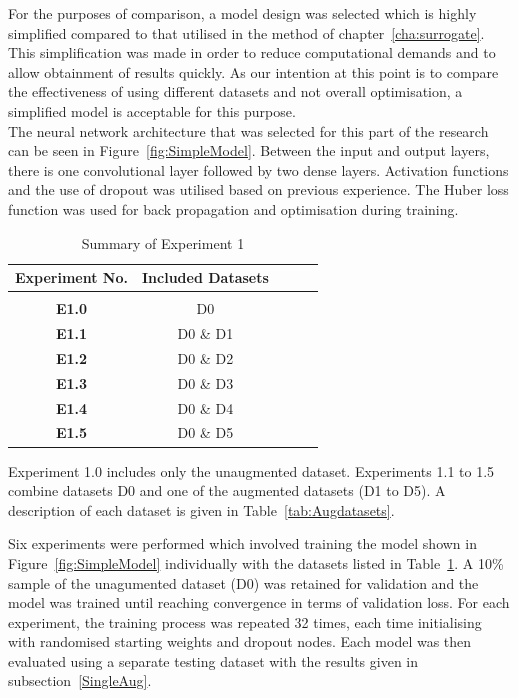 \noindent
For the purposes of comparison, a model design was selected which is highly simplified compared to that utilised in the method of chapter~\ref{cha:surrogate}. This simplification was made in order to reduce computational demands and to allow obtainment of results quickly. As our intention at this point is to compare the effectiveness of using different datasets and not overall optimisation, a simplified model is acceptable for this purpose. 
\\

\noindent
The neural network architecture that was selected for this part of the research can be seen in Figure~\ref{fig:SimpleModel}. Between the input and output layers, there is one convolutional layer followed by two dense layers. Activation functions and the use of dropout was utilised based on previous experience. The Huber loss function was used for back propagation and optimisation during training.
\\

\begin{table}[h!]
	 \begin{center}
		
		\begin{tabular}{c|c|c|r|c} %
			\textbf{Experiment No.} & \textbf{Included Datasets}  \\
			
			\hline
			& \\
			\textbf{E1.0} &  D0 \\
			\textbf{E1.1} & D0 \& D1 \\ 
			\textbf{E1.2} & D0 \& D2 \\
			\textbf{E1.3} & D0 \& D3 \\
			\textbf{E1.4} & D0 \& D4 \\
			\textbf{E1.5} & D0 \& D5 \\ 
			
		\end{tabular}
		\caption{Summary of Experiment 1} {Experiment 1.0 includes only the unaugmented dataset. Experiments 1.1 to 1.5 combine datasets D0 and one of the augmented datasets (D1 to D5). A description of each dataset is given in Table~\ref{tab:Augdatasets}.}
		\label{tab:Experiment1}
		 \end{center}
\end{table}

\noindent
Six experiments were performed which involved training the model shown in Figure~\ref{fig:SimpleModel} individually with the datasets listed in Table~\ref{tab:Experiment1}. A 10\% sample of the unagumented dataset (D0) was retained for validation and the model was trained until reaching convergence in terms of validation loss. For each experiment, the training process was repeated 32 times, each time initialising with randomised starting weights and dropout nodes. Each model was then evaluated using a separate testing dataset with the results given in subsection~\ref{SingleAug}.
\\

